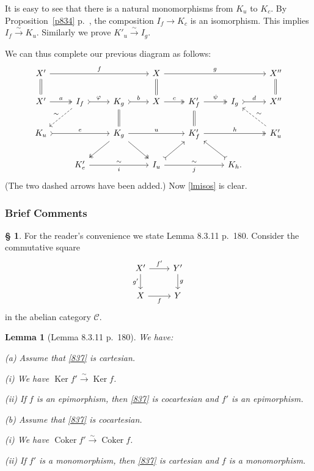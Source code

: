 \documentclass[12pt]{article}
\newtheorem{lem}[thm]{Lemma}
\theoremstyle{remark}
\theoremstyle{definition}
\newtheorem{s}[thm]{\S}
\newcommand{\nn}{\noindent}
\newcommand{\C}{\mathcal C}
\newcommand{\pp}{\varphi}
\newcommand{\xr}{\xrightarrow}
\DeclareMathOperator{\Coker}{Coker}
\DeclareMathOperator{\Ker}{Ker}
\begin{document}
It is easy to see that there is a natural monomorphisms from $K_u$ to $K_c$. By Proposition~\ref{p834} p.~\pageref{p834}, the composition $I_f\to K_c$ is an isomorphism. This implies $I_f\xr\sim K_u$. Similarly we prove $K'_u\xr\sim I_g$. 

We can thus complete our previous diagram as follows: 
$$
\begin{tikzcd}
X'\ar{rrr}{f}\ar[equal]{d}&&&X\ar[equal]{d}\ar{rrr}{g}&&&X''\ar[equal]{d}\\ 
X'\ar[two heads]{r}{a}&I_f\ar[dashed]{dl}[swap]{\sim}\ar[tail]{r}{\pp}&K_g\ar[equal]{d}\ar[tail]{r}{b}&X\ar[two heads]{r}{c}&K'_f\ar[equal]{d}\ar[two heads]{r}{\psi}&I_g\ar[tail]{r}{d}&X''\\ 
K_u\ar[tail]{rr}{e}&&K_g\ar[two heads]{dl}\ar[two heads]{dr}\ar{rr}{u}&&K'_f\ar[two heads]{rr}{h}&&K'_u\ar[dashed]{ul}[swap]{\sim}\\ 
&K'_e\ar{rr}{\sim}[swap]{i}&&I_u\ar[tail]{ur}\ar{rr}{\sim}[swap]{j}&&K_h.\ar[tail]{ul}
\end{tikzcd}
$$ 
(The two dashed arrows have been added.) Now \eqref{lmisos} is clear.


\subsubsection{Brief Comments}

\begin{s} 
For the reader's convenience we state Lemma 8.3.11 p.~180. Consider the commutative square 
%
\begin{equation}\label{837}
\begin{tikzcd}
X'\ar{d}[swap]{g'}\ar{r}{f'}&Y'\ar{d}{g}\\ 
X\ar{r}[swap]{f}&Y
\end{tikzcd}
\end{equation} 
%
in the abelian category $\C$. 

\begin{lem}[Lemma 8.3.11 p.~180]\label{8311}
We have:

\nn\emph{(a)} Assume that \eqref{837} is cartesian. 

\emph{(i)} We have $\Ker f'\xr\sim\Ker f$. 

\emph{(ii)} If $f$ is an epimorphism, then \eqref{837} is cocartesian and $f'$ is an epimorphism.

\nn\emph{(b)} Assume that \eqref{837} is cocartesian.

\emph{(i)} We have $\Coker f'\xr\sim\Coker f$.

\emph{(ii)} If $f'$ is a monomorphism, then \eqref{837} is cartesian and $f$ is a
monomorphism.
\end{lem} 
\end{s} 
\end{document}
